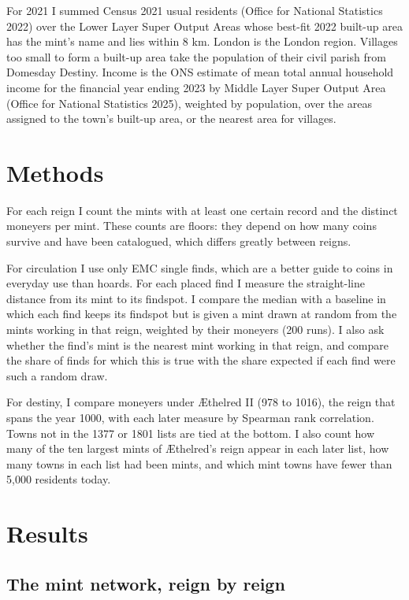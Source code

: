 \documentclass[11pt,a4paper]{article}
\begin{document}
For 2021 I summed Census 2021 usual residents (Office for National Statistics 2022) over the Lower Layer Super Output Areas whose best-fit 2022 built-up area has the mint's name and lies within 8 km. London is the London region. Villages too small to form a built-up area take the population of their civil parish from Domesday Destiny. Income is the ONS estimate of mean total annual household income for the financial year ending 2023 by Middle Layer Super Output Area (Office for National Statistics 2025), weighted by population, over the areas assigned to the town's built-up area, or the nearest area for villages.

\section{Methods}

For each reign I count the mints with at least one certain record and the distinct moneyers per mint. These counts are floors: they depend on how many coins survive and have been catalogued, which differs greatly between reigns.

For circulation I use only EMC single finds, which are a better guide to coins in everyday use than hoards. For each placed find I measure the straight-line distance from its mint to its findspot. I compare the median with a baseline in which each find keeps its findspot but is given a mint drawn at random from the mints working in that reign, weighted by their moneyers (200 runs). I also ask whether the find's mint is the nearest mint working in that reign, and compare the share of finds for which this is true with the share expected if each find were such a random draw.

For destiny, I compare moneyers under Æthelred II (978 to 1016), the reign that spans the year 1000, with each later measure by Spearman rank correlation. Towns not in the 1377 or 1801 lists are tied at the bottom. I also count how many of the ten largest mints of Æthelred's reign appear in each later list, how many towns in each list had been mints, and which mint towns have fewer than 5,000 residents today.

\section{Results}

\subsection{The mint network, reign by reign}
\end{document}
